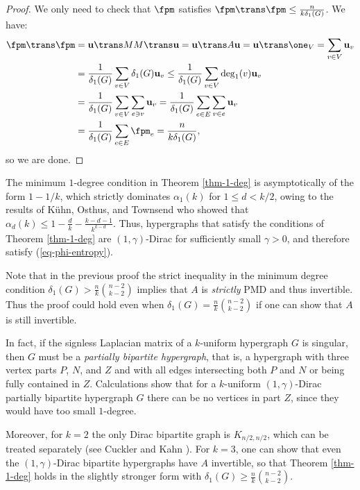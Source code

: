 \documentclass[11pt]{article}
\newcommand{\vw}{\mathbf{u}}
\begin{document}
\begin{proof}
    We only need to check that $\fpm$ satisfies $\fpm\trans\fpm\le\frac{n}{k\delta_1(G)}$. We have:
    \begin{align*}
        \fpm\trans\fpm&=\vw\trans MM\trans\vw=\vw\trans A\vw=\vw\trans\one_V=\sum_{v\in V}\vw_v\\&=\frac{1}{\delta_1(G)}\sum_{v\in V}\delta_1(G)\vw_v\le\frac{1}{\delta_1(G)}\sum_{v\in V}\deg_1(v)\vw_v\\&=\frac{1}{\delta_1(G)}\sum_{v\in V}\sum_{e\ni v}\vw_v=\frac{1}{\delta_1(G)}\sum_{e\in E}\sum_{v\in e}\vw_v\\&=\frac{1}{\delta_1(G)}\sum_{e\in E}\fpm_e=\frac{n}{k\delta_1(G)},
    \end{align*}
    so we are done.
\end{proof}

\begin{remark}
    The minimum $1$-degree condition in Theorem \ref{thm-1-deg} is asymptotically of the form $1-1/k$, which strictly dominates $\alpha_1(k)$ for $1\le d<k/2$, owing to the results of K\"uhn, Osthus, and Townsend \cite{kuhn2014fractional} who showed that $\alpha_d(k)\le 1-\frac{d}{k}-\frac{k-d-1}{k^{k-d}}$. Thus, hypergraphs that satisfy the conditions of Theorem \ref{thm-1-deg} are $(1,\gamma)$-Dirac for sufficiently small $\gamma>0$, and therefore satisfy (\ref{eq-phi-entropy}).
\end{remark}

\begin{remark}
    Note that in the previous proof the strict inequality in the minimum degree condition $\delta_1(G)>\frac{n}{k}\binom{n-2}{k-2}$ implies that $A$ is \emph{strictly} PMD and thus invertible. Thus the proof could hold even when $\delta_1(G)=\frac{n}{k}\binom{n-2}{k-2}$ if one can show that $A$ is still invertible.
    
    In fact, if the signless Laplacian matrix of a $k$-uniform hypergraph $G$ is singular, then $G$ must be a \emph{partially bipartite hypergraph}, that is, a hypergraph with three vertex parts $P$, $N$, and $Z$ and with all edges intersecting both $P$ and $N$ or being fully contained in $Z$. Calculations show that for a $k$-uniform $(1,\gamma)$-Dirac partially bipartite hypergraph $G$ there can be no vertices in part $Z$, since they would have too small $1$-degree. %
    
    Moreover, for $k=2$ the only Dirac bipartite graph is $K_{n/2,n/2}$, which can be treated separately (see Cuckler and Kahn \cite[Lemma 3.3]{cuckler2009hamiltonian}). For $k=3$, one can show that even the $(1,\gamma)$-Dirac bipartite hypergraphs have $A$ invertible, so that Theorem \ref{thm-1-deg} holds in the slightly stronger form with $\delta_1(G)\ge\frac{n}{k}\binom{n-2}{k-2}$. 
\end{remark}
\end{document}
